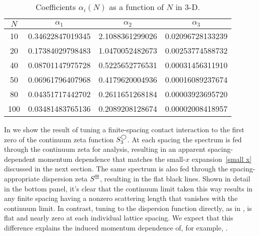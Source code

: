 \begin{table}
\caption{Coefficients $\alpha_i(N)$ as a function of $N$ in 3-D.\label{tab:slopes}}
\center
\begin{tabular}{c|ccc}
$N$ & $\alpha_1$ & $\alpha_2$ & $\alpha_3$ \\
\hline
10 & 0.34622847019345 &2.1088361299026 &0.02096728133239\\
20 & 0.17384029798483 &1.0470052482673 &0.00253774588732\\
40 & 0.08701147975728 &0.5225652776531 &0.00031456311910\\
50 & 0.06961796407968 &0.4179620004936 &0.00016089237674\\
80 & 0.04351717442702 &0.2611651268184 &0.00003923695720\\
100 &0.03481483765136 &0.2089208128674 &0.00002008418957
\end{tabular}
\end{table}

In  we show the result of tuning a finite-spacing contact interaction to the first zero of the continuum zeta function $S^\bigcirc_3$.
At each spacing the spectrum is fed through the continuum zeta for analysis, resulting in an apparent spacing-dependent momentum dependence that matches the small-$x$ expansion~\eqref{small x} discussed in the next section.
The same spectrum is also fed through the spacing-appropriate dispersion zeta $S^\boxplus$, resulting in the flat black lines.
Shown in detail in the bottom panel, it's clear that the continuum limit taken this way results in any finite spacing having a nonzero scattering length that vanishes with the continuum limit.
In contrast, tuning to the dispersion function directly, as in , is flat and nearly zero at each individual lattice spacing.
We expect that this difference explains the induced momentum dependence of, for example, .
